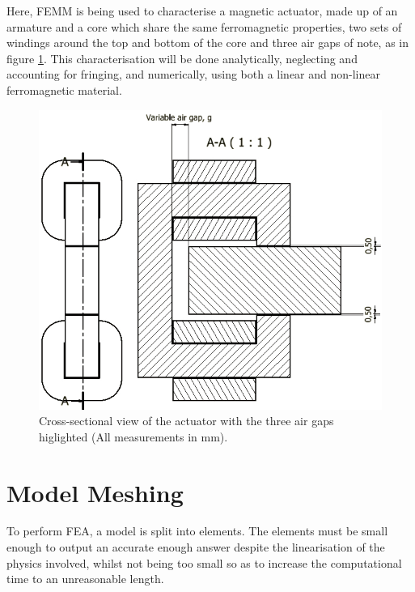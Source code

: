 \documentclass[a4paper]{IEEEtran}
\begin{document}
    Here, FEMM is being used to characterise a magnetic actuator, made up of an armature and a core which share the same ferromagnetic properties, two sets of windings around the top and bottom of the core and three air gaps of note, as in figure \ref{xsection}. This characterisation will be done analytically, neglecting and accounting for fringing, and numerically, using both a linear and non-linear ferromagnetic material. 

    \begin{figure}[ht]
        \includegraphics[width = \linewidth]{actuator-2.jpg}
        \caption{Cross-sectional view of the actuator with the three air gaps higlighted (All measurements in mm).}
        \label{xsection} 
    \end{figure}

\section{Model Meshing}

    To perform FEA, a model is split into elements. The elements must be small enough to output an accurate enough answer despite the linearisation of the physics involved, whilst not being too small so as to increase the computational time to an unreasonable length.
\end{document}
